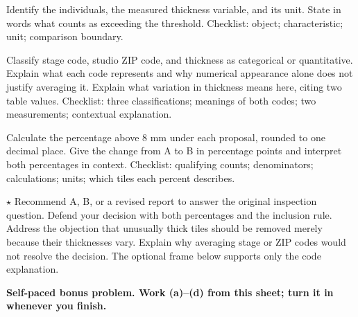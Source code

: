 \documentclass[12pt]{extarticle}
\begin{document}
\begin{description}[leftmargin=1.15in, labelwidth=1in, itemsep=2pt, topsep=2pt]
  \item[\dokbadge{1}~(a)] Identify the individuals, the measured thickness variable, and its unit. State in words what counts as exceeding the threshold. Checklist: object; characteristic; unit; comparison boundary.
  \item[\dokbadge{2}~(b)] Classify stage code, studio ZIP code, and thickness as categorical or quantitative. Explain what each code represents and why numerical appearance alone does not justify averaging it. Explain what variation in thickness means here, citing two table values. Checklist: three classifications; meanings of both codes; two measurements; contextual explanation.
  \item[\dokbadge{2}~(c)] Calculate the percentage above 8 mm under each proposal, rounded to one decimal place. Give the change from A to B in percentage points and interpret both percentages in context. Checklist: qualifying counts; denominators; calculations; units; which tiles each percent describes.
  \item[\dokbadge{3}~(d)] $\star$ Recommend A, B, or a revised report to answer the original inspection question. Defend your decision with both percentages and the inclusion rule. Address the objection that unusually thick tiles should be removed merely because their thicknesses vary. Explain why averaging stage or ZIP codes would not resolve the decision. The optional frame below supports only the code explanation.
\end{description}

\vfill
\textbf{Self-paced bonus problem. Work (a)--(d) from this sheet; turn it in whenever you finish.}
\end{document}
